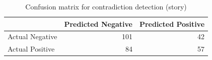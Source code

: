 \begin{table}
\caption{Confusion matrix for contradiction detection (story)}
\label{tab:confusion_matrix}
\begin{tabular}{lrr}
\toprule
 & Predicted Negative & Predicted Positive \\
\midrule
Actual Negative & 101 & 42 \\
Actual Positive & 84 & 57 \\
\bottomrule
\end{tabular}
\end{table}

